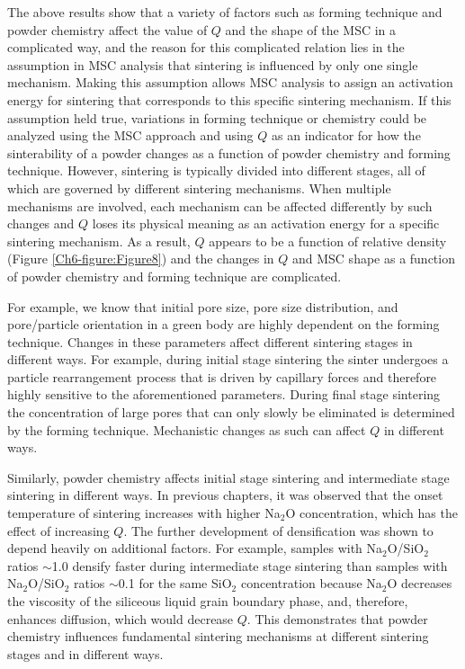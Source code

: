 The above results show that a variety of factors such as forming technique and powder chemistry affect the value of $Q$ and the shape of the MSC in a complicated way, and the reason for this complicated relation lies in the assumption in MSC analysis that sintering is influenced by only one single mechanism. Making this assumption allows MSC analysis to assign an activation energy for sintering that corresponds to this specific sintering mechanism. If this assumption held true, variations in forming technique or chemistry could be analyzed using the MSC approach and using $Q$ as an indicator for how the sinterability of a powder changes as a function of powder chemistry and forming technique. However, sintering is typically divided into different stages, all of which are governed by different sintering mechanisms. When multiple mechanisms are involved, each mechanism can be affected differently by such changes and $Q$ loses its physical meaning as an activation energy for a specific sintering mechanism. As a result, $Q$ appears to be a function of relative density (Figure \ref{Ch6-figure:Figure8}) and the changes in $Q$ and MSC shape as a function of powder chemistry and forming technique are complicated.

For example, we know that initial pore size, pore size distribution, and pore/particle orientation in a green body are highly dependent on the forming technique. Changes in these parameters affect different sintering stages in different ways. For example, during initial stage sintering the sinter undergoes a particle rearrangement process that is driven by capillary forces and therefore highly sensitive to the aforementioned parameters. During final stage sintering the concentration of large pores that can only slowly be eliminated is determined by the forming technique. Mechanistic changes as such can affect $Q$ in different ways.

Similarly, powder chemistry affects initial stage sintering and intermediate stage sintering in different ways. In previous chapters, it was observed that the onset temperature of sintering increases with higher Na$_{2}$O concentration, which has the effect of increasing $Q$. The further development of densification was shown to depend heavily on additional factors. For example, samples with Na$_{2}$O/SiO$_{2}$ ratios $\sim$1.0 densify faster during intermediate stage sintering than samples with Na$_{2}$O/SiO$_{2}$ ratios $\sim$0.1 for the same SiO$_{2}$ concentration because Na$_{2}$O decreases the viscosity of the siliceous liquid grain boundary phase, and, therefore, enhances diffusion, which would decrease $Q$. This demonstrates that powder chemistry influences fundamental sintering mechanisms at different sintering stages and in different ways. 

